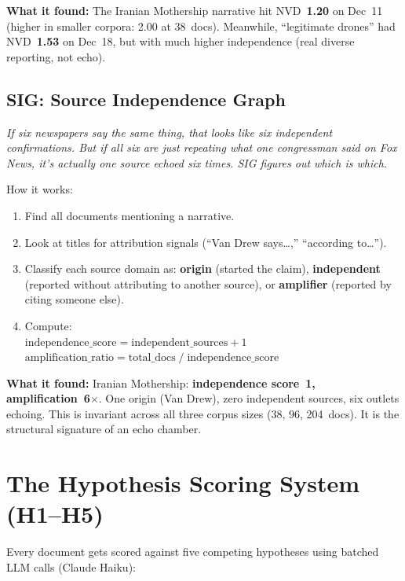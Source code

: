 \documentclass[11pt, letterpaper]{article}
\newcommand{\method}[1]{\textbf{\textcolor{accent}{#1}}}
\newcommand{\eli}[1]{\textit{\small #1}}
\begin{document}
\textbf{What it found:} The Iranian Mothership narrative hit NVD~\textbf{1.20} on Dec~11 (higher in smaller corpora: 2.00 at 38~docs).
Meanwhile, ``legitimate drones'' had NVD~\textbf{1.53} on Dec~18, but with much higher independence (real diverse reporting, not echo).

\subsection{\method{SIG}: Source Independence Graph}

\eli{If six newspapers say the same thing, that looks like six independent confirmations.
But if all six are just repeating what one congressman said on Fox News, it's actually one source echoed six times.
SIG figures out which is which.}

How it works:

\begin{enumerate}[nosep]
  \item Find all documents mentioning a narrative.
  \item Look at titles for attribution signals (``Van Drew says\ldots,'' ``according to\ldots'').
  \item Classify each source domain as: \textbf{origin} (started the claim), \textbf{independent} (reported without attributing to another source), or \textbf{amplifier} (reported by citing someone else).
  \item Compute:\\[4pt]
    $\text{independence\_score} = \text{independent\_sources} + 1$\\[2pt]
    $\text{amplification\_ratio} = \text{total\_docs} \;/\; \text{independence\_score}$
\end{enumerate}

\textbf{What it found:} Iranian Mothership: \textbf{independence score~1, amplification~6$\times$}.
One origin (Van Drew), zero independent sources, six outlets echoing.
This is invariant across all three corpus sizes (38, 96, 204~docs).
It is the structural signature of an echo chamber.


\section{The Hypothesis Scoring System (H1--H5)}

Every document gets scored against five competing hypotheses using batched LLM calls (Claude Haiku):
\end{document}
